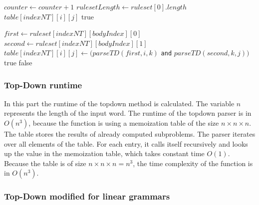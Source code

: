\documentclass[a4paper, 11pt]{article}
\begin{document}
\begin{center}
\label{alg:cap}
\begin{algorithmic}[1]
\State $counter \gets counter+1$
\State $rulesetLength \gets ruleset[0].length$
\State \Return $table[indexNT][i][j]$
\EndIf
{}
\State \Return true
\EndIf
\EndFor

\Else
{}
\State $first \gets ruleset[indexNT][bodyIndex][0]$
\State $second \gets ruleset[indexNT][bodyIndex][1]$
\State $table[indexNT][i][j] \gets (parseTD(first,i,k)$ \texttt{and} $parseTD(second,k,j))$
\State \Return true
\EndIf
\EndFor
\EndIf
\EndFor
\EndIf
\State \Return false
\end{algorithmic}
\hrulefill
\end{center}

\subsubsection{Top-Down runtime}
\label{topdownruntime}

In this part the runtime of the topdown method is calculated.
The variable $n$ represents the length of the input word. 
The runtime of the topdown parser is in $O(n^3)$, because the function is using a memoization table of the size $n \times n \times n$. The table stores the results of already computed subproblems.
The parser iterates over all elements of the table. For each entry, it calls itself recursively and looks up the value in the memoization table, which takes constant time $O(1)$. Because the table is of size $n \times n \times n =n^3$, the time complexity of the function is in $O(n^3)$.



\subsubsection{Top-Down modified for linear grammars}
\label{lineartopdown}
\end{document}
